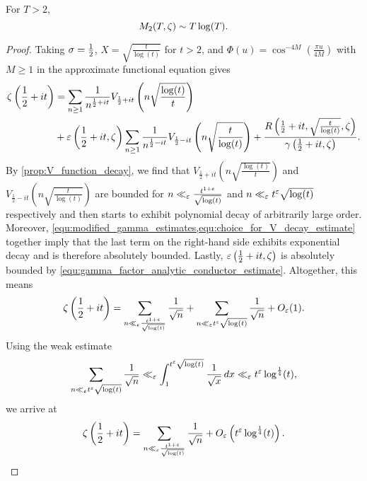     \begin{theorem}
      For $T > 2$,
      \[
        M_{2}(T,\zeta) \sim T\log(T).
      \]
    \end{theorem}
    \begin{proof}
      Taking $\sigma = \frac{1}{2}$, $X = \sqrt{\frac{t}{\log(t)}}$ for $t > 2$, and $\Phi(u) = \cos^{-4M}\left(\frac{\pi u}{4M}\right)$ with $M \ge 1$ in the approximate functional equation gives
      \begin{align*}
        \zeta\left(\frac{1}{2}+it\right) &= \sum_{n \ge 1}\frac{1}{n^{\frac{1}{2}+it}}V_{\frac{1}{2}+it}\left(n\sqrt{\frac{\log(t)}{t}}\right) \\
        &+ \varepsilon\left(\frac{1}{2}+it,\zeta\right)\sum_{n \ge 1}\frac{1}{n^{\frac{1}{2}-it}}V_{\frac{1}{2}-it}\left(n\sqrt{\frac{t}{\log(t)}}\right)+\frac{R\left(\frac{1}{2}+it,\sqrt{\frac{t}{\log(t)}},\zeta\right)}{\gamma\left(\frac{1}{2}+it,\zeta\right)}.
      \end{align*}
      By \cref{prop:V_function_decay}, we find that $V_{\frac{1}{2}+it}\left(n\sqrt{\frac{\log(t)}{t}}\right)$ and $V_{\frac{1}{2}-it}\left(n\sqrt{\frac{t}{\log(t)}}\right)$ are bounded for $n \ll_{\varepsilon} \frac{t^{1+\varepsilon}}{\sqrt{\log(t)}}$ and $n \ll_{\varepsilon} t^{\varepsilon}\sqrt{\log(t)}$ respectively and then starts to exhibit polynomial decay of arbitrarily large order. Moreover, \cref{equ:modified_gamma_estimates,equ:choice_for_V_decay_estimate} together imply that the last term on the right-hand side exhibits exponential decay and is therefore absolutely bounded. Lastly, $\varepsilon\left(\frac{1}{2}+it,\zeta\right)$ is absolutely bounded by \cref{equ:gamma_factor_analytic_conductor_estimate}. Altogether, this means
      \[
        \zeta\left(\frac{1}{2}+it\right) = \sum_{n \ll_{\varepsilon} \frac{t^{1+\varepsilon}}{\sqrt{\log(t)}}}\frac{1}{\sqrt{n}}+\sum_{n \ll_{\varepsilon} t^{\varepsilon}\sqrt{\log(t)}}\frac{1}{\sqrt{n}}+O_{\varepsilon}(1).
      \]
      Using the weak estimate
      \[
        \sum_{n \ll_{\varepsilon} t^{\varepsilon}\sqrt{\log(t)}}\frac{1}{\sqrt{n}} \ll_{\varepsilon} \int_{1}^{t^{\varepsilon}\sqrt{\log(t)}}\frac{1}{\sqrt{x}}\,dx \ll_{\varepsilon} t^{\varepsilon}\log^{\frac{1}{4}}(t),
      \]
      we arrive at
      \[
        \zeta\left(\frac{1}{2}+it\right) = \sum_{n \ll_{\varepsilon} \frac{t^{1+\varepsilon}}{\sqrt{\log(t)}}}\frac{1}{\sqrt{n}}+O_{\varepsilon}\left(t^{\varepsilon}\log^{\frac{1}{4}}(t)\right).
      \]
    \end{proof}
